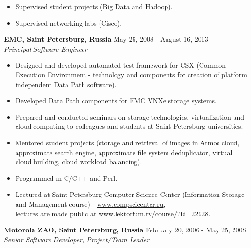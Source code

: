\documentclass[a4paper,12pt,]{article}
\begin{document}
\begin{description}
\begin{itemize}
    \item Supervised student projects (Big Data and Hadoop).

    \item Supervised networking labs (Cisco).

    \end{itemize}

  \item{\bfseries EMC, Saint Petersburg, Russia} \hfill  May 26, 2008 - August 16, 2013 \\
    {\em Principal Software Engineer}  

    \begin{itemize}

    \item Designed and developed automated test framework for CSX (Common Execution Environment - technology and components for creation of platform independent Data Path software). 

    \item Developed Data Path components for EMC VNXe storage systems.

    \item Prepared and conducted seminars on storage technologies, virtualization and cloud computing to colleagues and students at Saint Petersburg universities. 

    \item Mentored student projects (storage and retrieval of images in Atmos cloud, approximate search engine, approximate file system deduplicator, virtual cloud building, cloud workload balancing).

    \item Programmed in C/C++ and Perl.

    \item Lectured at Saint Petersburg Computer Science Center (Information Storage and Management course) - \url{www.compscicenter.ru}, \\
	    lectures are made public at \url{www.lektorium.tv/course/?id=22928}.

    \end{itemize}

  \item{\bfseries Motorola ZAO, Saint Petersburg, Russia} \hfill February 20, 2006 - May 25, 2008 \\
    {\em Senior Software Developer, Project/Team Leader}  

    \begin{itemize}


\end{itemize}
\end{description}
\end{document}
